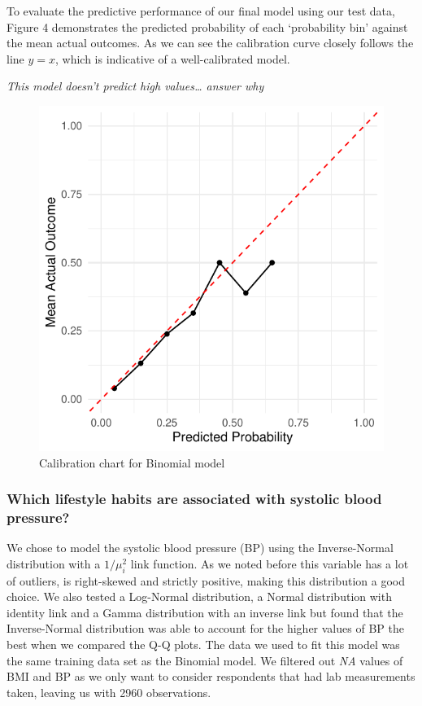 \documentclass[
  11pt,
  twocolumn]{article}
\begin{document}
To evaluate the predictive performance of our final model using our test
data, Figure 4 demonstrates the predicted probability of each
`probability bin' against the mean actual outcomes. As we can see the
calibration curve closely follows the line \(y = x\), which is
indicative of a well-calibrated model.

\emph{This model doesn't predict high values\ldots{} answer why}

\begin{figure}[H]

{\centering \includegraphics{Coursework_files/figure-latex/output-calibration-chart-1} 

}

\caption{Calibration chart for Binomial model}\label{fig:output-calibration-chart}
\end{figure}

\hypertarget{which-lifestyle-habits-are-associated-with-systolic-blood-pressure}{%
\subsubsection{Which lifestyle habits are associated with systolic blood
pressure?}\label{which-lifestyle-habits-are-associated-with-systolic-blood-pressure}}

We chose to model the systolic blood pressure (BP) using the
Inverse-Normal distribution with a \(1/\mu_i^2\) link function. As we
noted before this variable has a lot of outliers, is right-skewed and
strictly positive, making this distribution a good choice. We also
tested a Log-Normal distribution, a Normal distribution with identity
link and a Gamma distribution with an inverse link but found that the
Inverse-Normal distribution was able to account for the higher values of
BP the best when we compared the Q-Q plots. The data we used to fit this
model was the same training data set as the Binomial model. We filtered
out \emph{NA} values of BMI and BP as we only want to consider
respondents that had lab measurements taken, leaving us with 2960
observations.
\end{document}

